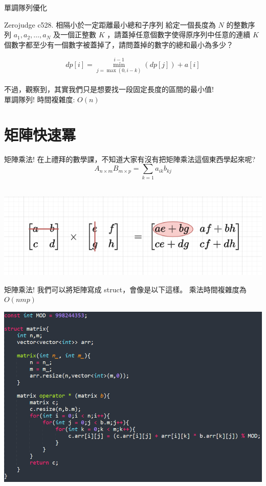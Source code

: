 \documentclass[aspectratio=169]{beamer}
\begin{document}
\begin{frame}[fragile]{單調隊列優化}
    \begin{block}{Zerojudge c528. 相隔小於一定距離最小總和子序列}
    給定一個長度為 $N$ 的整數序列 $a_1,a_2,\dots,a_N$
    及一個正整數 $K$ ，請蓋掉任意個數字使得原序列中任意的連續 $K$ 個數字都至少有一個數字被蓋掉了，請問蓋掉的數字的總和最小為多少？
    \end{block} 
        $$dp[i] = \min_{j=\max(0,i-k)}^{i-1}(dp[j])+a[i]$$ \\
    不過，觀察到，其實我們只是想要找一段固定長度的區間的最小值! \\
    單調隊列! 時間複雜度: $O(n)$
\end{frame}

\section{矩陣快速冪}

\begin{frame}[fragile]{矩陣乘法!}
    在上禮拜的數學課，不知道大家有沒有把矩陣乘法這個東西學起來呢? \\
    $$A_{n \times m} B_{m \times p} = \sum_{k=1} a_{ik} b_{kj}$$ \\
    
    \begin{center}
        \includegraphics[scale=0.45]{images/matrix multiplication.png}
    \end{center}
\end{frame}

\begin{frame}[fragile]{矩陣乘法!}
    我們可以將矩陣寫成 struct，會像是以下這樣。 乘法時間複雜度為 $O(nmp)$
    
    \begin{center}
        \includegraphics[scale=0.45]{images/matrix.png}
    \end{center}
\end{frame}
\end{document}

